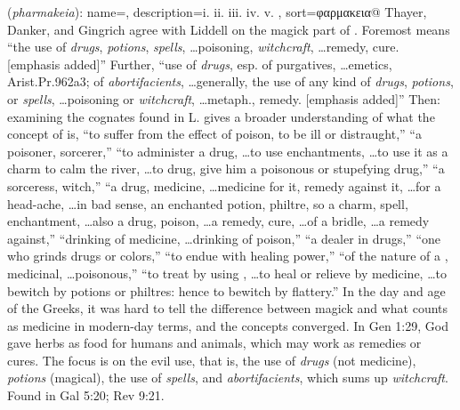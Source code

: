 \item[Witchcraft (use of),]

(\textit{pharmakeia}):
{
    name=,
    description={i.  ii.  iii.  iv.  v. },
    sort=φαρμακεια@
}
Thayer, Danker, and Gingrich agree with Liddell on the magick part of . 
Foremost  means ``the use of \emph{drugs}, \emph{potions}, \emph{spells}, \ldots poisoning, \emph{witchcraft}, \ldots remedy, cure. [emphasis added]''
Further, ``use of \emph{drugs}, esp. of purgatives, \ldots emetics, Arist.Pr.962a3; of \emph{abortifacients}, \ldots generally, the use of any kind of \emph{drugs}, \emph{potions}, or \emph{spells}, \ldots poisoning or \emph{witchcraft}, \ldots metaph., remedy. [emphasis added]'' 
Then: examining the cognates found in L. gives a broader understanding of what the concept of  is,  ``to suffer from the effect of poison, to be ill or distraught,''  ``a poisoner, sorcerer,''  ``to administer a drug, \ldots to use enchantments, \ldots to use it as a charm to calm the river, \ldots to drug, give him a poisonous or stupefying drug,''  ``a sorceress, witch,''  ``a drug, medicine, \ldots medicine for it, remedy against it, \ldots for a head-ache, \ldots in bad sense, an enchanted potion, philtre, so a charm, spell, enchantment, \ldots also a drug, poison, \ldots a remedy, cure, \ldots of a bridle, \ldots a remedy against,''  ``drinking of medicine, \ldots drinking of poison,''  ``a dealer in drugs,''  ``one who grinds drugs or colors,''  ``to endue with healing power,''  ``of the nature of a , medicinal, \ldots poisonous,''  ``to treat by using , \ldots to heal or relieve by medicine, \ldots to bewitch by potions or philtres: hence to bewitch by flattery.'' 
In the day and age of the Greeks, it was hard to tell the difference between magick and what counts as medicine in modern-day terms, and the concepts converged. In Gen 1:29, God gave herbs as food for humans and animals, which may work as remedies or cures. The focus is on the evil use, that is, the use of \emph{drugs} (not medicine), \emph{potions} (magical), the use of \emph{spells}, and \emph{abortifacients}, which sums up \emph{witchcraft}.
Found in Gal 5:20; Rev 9:21.
